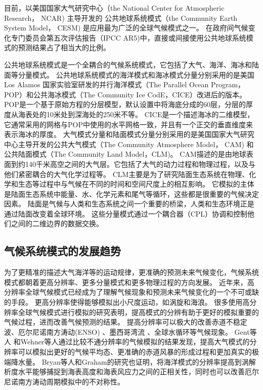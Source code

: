  
目前，以美国国家大气研究中心（the National Center for Atmospheric Research， NCAR) 主导开发的
公共地球系统模式（the Community Earth System Model， CESM) 是应用最为广泛的全球气候模式之一\cite{hurrell2013community}。
在政府间气候变化专门委员会第五次评估报告（IPCC AR5)中，直接或间接使用公共地球系统模式的预测结果占了相当大的比例\cite{stocker2013ipcc}。
 

公共地球系统模式是一个全耦合的气候系统模式，它包括了大气、海洋、海冰和陆面等分量模式。
公共地球系统模式的海洋模式和海冰模式分量分别采用的是美国Los Alamos 国家实验室研发的并行海洋模式（The Parallel Ocean Program，POP）和公共海冰模式（The Community Ice CodE，CICE）改进后的版本\cite{hurrell2013community}。
POP是一个基于原始方程的分层模型，默认设置中将海底分成的60层，分层的厚度从海表处的10米处到深海处的250米不等。
CICE是一个描述海冰的二维模型，它通常采用的网格与POP中使用的水平网格一致，并且有一个正交的垂直维度来表示海冰的厚度。 
大气模式分量和陆面模式分量分别采用的是美国国家大气研究中心主导开发的公共大气模式（The Community Atmosphere Model， CAM) 和公共陆面模式（The Community Land Model，CLM)。 
CAM描述的是由地球表面到约140千米高空之间的大气层。它包括了大气的动力过程和物理过程，以及与他们紧密耦合的大气化学过程等。
CLM主要是为了研究陆面生态系统在物理、化学和生态等过程中与气候在不同的时间和空间尺度上的相互影响。
它模拟的主体是陆面生态系统中能量、水、化学元素和尾气等循环，这些都是很重要的气候决定因素。
陆面是气候与人类和生态系统之间一个重要的桥梁，人类和生态环境正是通过陆面改变着全球环境。
这些分量模式通过一个耦合器（CPL）协调和控制他们之间的二维边界的数据交换\cite{liu2014c}。

 

\subsection{气候系统模式的发展趋势}

为了更精准的描述大气海洋等的运动规律，更准确的预测未来气候变化，气候系统模式都朝着更高分辨率、更多分量模式和更多物理过程的方向发展\cite{stocker2013ipcc}。
近年来，高分辨率全球气候模式已经成为了理解气候现象和预测未来气候变化的一个不可或缺的手段。
更高分辨率使得能够模拟出小尺度运动，如涡旋和海浪。 
很多使用高分辨率全球气候模式进行模拟的研究表明，提高模式的分辨有助于更好的模拟重要的气候过程，进而改善气候预测的结果。
提高分辨率可以极大的改善赤道不稳定波\citep{roberts2009impact}、厄尔尼诺南方涛动(ENSO) \citep{shaffrey2009uk}、墨西哥湾流\citep{chassignet2008gulf, kuwano2010precipitation} 、全球水循环\citep{demory2014role}等气候现象。
Gent等人\cite{gent2010improvements} 和Wehner等人\cite{wehner2014effect}通过比较不通分辨率的气候模拟的结果发现，提高大气模式的分辨率可以模拟出更好的气候平均态、更准确的赤道风暴的形成过程和更加真实的极端降水量。
Bryan等人\cite{bryan2010frontal}和Graham\cite{graham2014importance}的研究也证明，将海洋模式的分辨率提高到涡解析度水平能够捕捉到海表高度和海表风应力之间的正相关性，同时也可以改善厄尔尼诺南方涛动周期模拟中的不对称性。



